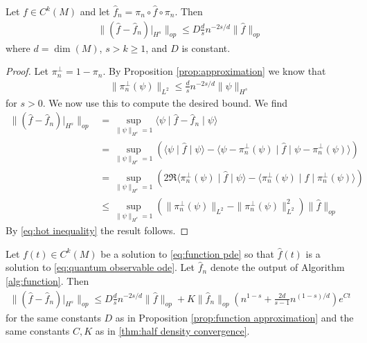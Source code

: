 \documentclass[final,leqno]{siamltex1213}
\begin{document}
\begin{proposition} \label{prop:function approximation}
	Let $f \in C^{k}(M)$ and let $\hat{f}_{n} = \pi_{n} \circ \hat{f} \circ \pi_{n}$.  Then
	\begin{align}
		\| ( \hat{f} - \hat{f}_{n} )|_{H^{s}} \|_{op} \leq D \frac{d}{s} n^{-2s/d} \| \hat{f} \|_{op}
	\end{align}
	where $d= \dim(M)$, $s > k \geq 1$, and $D$ is constant.
\end{proposition}
\begin{proof}
	Let $\pi_{n}^{\perp} = 1 - \pi_{n}$.  By Proposition \ref{prop:approximation} we know that
	\begin{align}
		\| \pi_{n}^{\perp}(\psi) \|_{L^{2}} \leq \frac{d}{s} n^{-2s/d} \| \psi \|_{H^{s}} \label{eq:hot inequality}
	\end{align}
	for $s>0$.  We now use this to compute the desired bound.  We find
	\begin{align}
		\| (\hat{f} - \hat{f}_{n})|_{H^{s}} \|_{op} &= \sup_{\| \psi \|_{H^{s}}=1} \langle \psi \mid \hat{f} - \hat{f}_{n} \mid \psi \rangle \\
			&= \sup_{\| \psi \|_{H^{s}}=1} \left( \langle \psi \mid \hat{f}  \mid \psi \rangle - \langle \psi - \pi_{n}^{\perp}(\psi) \mid \hat{f} \mid \psi - \pi_{n}^{\perp}(\psi) \rangle \right) \\
			&= \sup_{\| \psi \|_{H^{s}}=1} \left( 2 \Re \langle \pi_{n}^{\perp}(\psi) \mid \hat{f} \mid \psi \rangle - \langle \pi_{n}^{\perp}(\psi) \mid \hat{f} \mid \pi_{n}^{\perp}(\psi) \rangle \right) \\
			&\leq \sup_{\| \psi \|_{H^{s}}=1}  ( \| \pi_{n}^{\perp}(\psi) \|_{L^{2}}- \| \pi_{n}^{\perp}(\psi) \|_{L^{2}}^{2} ) \| \hat{f} \|_{op} 
	\end{align}
	By \eqref{eq:hot inequality} the result follows.
\end{proof}

\begin{theorem} \label{thm:function convergence}
	Let $f(t) \in C^{k}(M)$ be a solution to \eqref{eq:function pde} so that $\hat{f}(t)$ is a solution to \eqref{eq:quantum observable ode}.
	Let $\hat{f}_{n}$ denote the output of Algorithm \ref{alg:function}.
	Then
	\begin{align}
		\| ( \hat{f} - \hat{f}_{n})|_{H^{s}} \|_{op} \leq D \frac{d}{s} n^{-2s/d} \| \hat{f} \|_{op}+  K \| \hat{f}_{n} \|_{op} \left( n^{1-s} + \frac{2d}{s -1} n^{(1-s)/d} \right) e^{Ct}
	\end{align}
	for the same constants $D$ as in Proposition \ref{prop:function approximation} and the same constants $C,K$ as in \ref{thm:half density convergence}.
\end{theorem}
\end{document}
